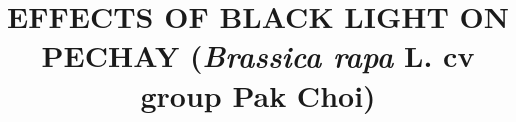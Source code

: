 \documentclass[10pt,oneside,draft]{pshscarc}
\title{EFFECTS OF BLACK LIGHT ON PECHAY (\textit{Brassica rapa} L. cv group Pak Choi)}
\begin{document}
\frontmatter





{\singlespacing
\tableofcontents
\listoftables
\listoffigures
}
\mainmatter

\appendix


\backmatter

\end{document}
